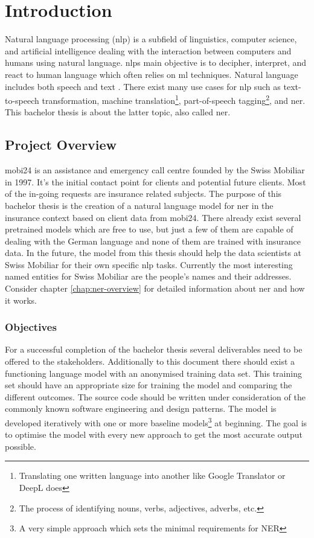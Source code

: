 \chapter{Introduction}

Natural language processing (\acrshort{nlp}) is a subfield of linguistics, computer science, and artificial intelligence dealing with the interaction between computers and humans using natural language. \acrshort{nlp}s main objective is to decipher, interpret, and react to human language which often relies on \acrlong{ml} techniques. Natural language includes both speech and text \cite{garbade}. There exist many use cases for \acrshort{nlp} such as text-to-speech transformation, machine translation\footnote{Translating one written language into another like Google Translator or DeepL does}, part-of-speech tagging\footnote{The process of identifying nouns, verbs, adjectives, adverbs, etc.}, and \acrlong{ner}. This bachelor thesis is about the latter topic, also called \acrshort{ner}.

\section{Project Overview}

\Gls{mobi24} is an assistance and emergency call centre founded by the Swiss Mobiliar in 1997. It's the initial contact point for clients and potential future clients. Most of the in-going requests are insurance related subjects. The purpose of this bachelor thesis is the creation of a natural language model for \acrlong{ner} in the insurance context based on client data from \gls{mobi24}. There already exist several pretrained models which are free to use, but just a few of them are capable of dealing with the German language and none of them are trained with insurance data. In the future, the model from this thesis should help the data scientists at Swiss Mobiliar for their own specific \acrshort{nlp} tasks. Currently the most interesting named entities for Swiss Mobiliar are the people's names and their addresses. Consider chapter \ref{chap:ner-overview} for detailed information about \acrshort{ner} and how it works.

\subsection{Objectives}

For a successful completion of the bachelor thesis several deliverables need to be offered to the stakeholders. Additionally to this document there should exist a functioning language model with an anonymised training data set. This training set should have an appropriate size for training the model and comparing the different outcomes. The source code should be written under consideration of the commonly known software engineering and design patterns. The model is developed iteratively with one or more baseline models\footnote{A very simple approach which sets the minimal requirements for NER} at beginning. The goal is to optimise the model with every new approach to get the most accurate output possible.

